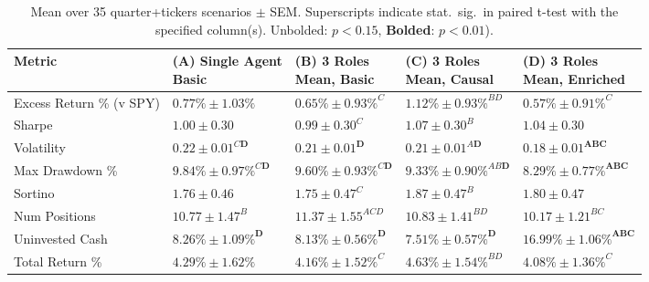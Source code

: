 \documentclass{article}
\begin{document}
\label{app:prompts}
\begin{table}[h]
\centering\small
\begin{tabular}{lllll}
\toprule
Metric & \shortstack{(A) Single Agent \\ Basic} & \shortstack{(B) 3 Roles \\ Mean, Basic} & \shortstack{(C) 3 Roles \\ Mean, Causal} & \shortstack{(D) 3 Roles \\ Mean, Enriched} \\
\midrule
Excess Return \% (v SPY) & $0.77\% \pm 1.03\%$ & ${0.65\% \pm 0.93\%}^{C}$ & ${1.12\% \pm 0.93\%}^{BD}$ & ${0.57\% \pm 0.91\%}^{C}$ \\
 Sharpe & $1.00 \pm 0.30$ & ${0.99 \pm 0.30}^{C}$ & ${1.07 \pm 0.30}^{B}$ & $1.04 \pm 0.30$ \\
 Volatility & ${0.22 \pm 0.01}^{C\mathbf{D}}$ & ${0.21 \pm 0.01}^{\mathbf{D}}$ & ${0.21 \pm 0.01}^{A\mathbf{D}}$ & ${0.18 \pm 0.01}^{\mathbf{A}\mathbf{B}\mathbf{C}}$ \\
Max Drawdown \% & ${9.84\% \pm 0.97\%}^{C\mathbf{D}}$ & ${9.60\% \pm 0.93\%}^{C\mathbf{D}}$ & ${9.33\% \pm 0.90\%}^{AB\mathbf{D}}$ & ${8.29\% \pm 0.77\%}^{\mathbf{A}\mathbf{B}\mathbf{C}}$ \\
 Sortino & $1.76 \pm 0.46$ & ${1.75 \pm 0.47}^{C}$ & ${1.87 \pm 0.47}^{B}$ & $1.80 \pm 0.47$ \\
Num Positions & ${10.77 \pm 1.47}^{B}$ & ${11.37 \pm 1.55}^{ACD}$ & ${10.83 \pm 1.41}^{BD}$ & ${10.17 \pm 1.21}^{BC}$ \\
Uninvested Cash & ${8.26\% \pm 1.09\%}^{\mathbf{D}}$ & ${8.13\% \pm 0.56\%}^{\mathbf{D}}$ & ${7.51\% \pm 0.57\%}^{\mathbf{D}}$ & ${16.99\% \pm 1.06\%}^{\mathbf{A}\mathbf{B}\mathbf{C}}$ \\
Total Return \% & $4.29\% \pm 1.62\%$ & ${4.16\% \pm 1.52\%}^{C}$ & ${4.63\% \pm 1.54\%}^{BD}$ & ${4.08\% \pm 1.36\%}^{C}$ \\
\bottomrule
\end{tabular}
\vspace{4pt}
\caption{Mean over 35 quarter+tickers scenarios $\pm$ SEM. Superscripts indicate stat.\ sig.\ in paired t-test with the specified column(s). Unbolded: $p < 0.15$, \textbf{Bolded}: $p < 0.01$).}
\label{tab:prompts}
\vspace{-1em}
\end{table}
\end{document}
